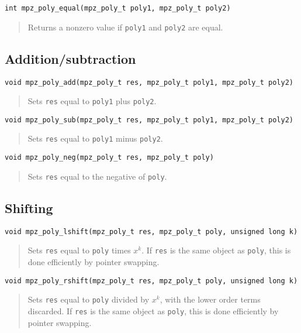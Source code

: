 \documentclass[a4paper,10pt]{article}
\newcommand{\code}{\lstinline}
\begin{document}
\begin{lstlisting}
int mpz_poly_equal(mpz_poly_t poly1, mpz_poly_t poly2)
\end{lstlisting}
\begin{quote}
Returns a nonzero value if \code{poly1} and \code{poly2} are equal.
\end{quote}



\subsection{Addition/subtraction}


\begin{lstlisting}
void mpz_poly_add(mpz_poly_t res, mpz_poly_t poly1, mpz_poly_t poly2)
\end{lstlisting}
\begin{quote}
Sets \code{res} equal to \code{poly1} plus \code{poly2}.
\end{quote}

\begin{lstlisting}
void mpz_poly_sub(mpz_poly_t res, mpz_poly_t poly1, mpz_poly_t poly2)
\end{lstlisting}
\begin{quote}
Sets \code{res} equal to \code{poly1} minus \code{poly2}.
\end{quote}

\begin{lstlisting}
void mpz_poly_neg(mpz_poly_t res, mpz_poly_t poly)
\end{lstlisting}
\begin{quote}
Sets \code{res} equal to the negative of \code{poly}.
\end{quote}


\subsection{Shifting}

\begin{lstlisting}
void mpz_poly_lshift(mpz_poly_t res, mpz_poly_t poly, unsigned long k)
\end{lstlisting}
\begin{quote}
Sets \code{res} equal to \code{poly} times $x^k$. If \code{res} is the same object as \code{poly}, this is done efficiently by pointer swapping.
\end{quote}

\begin{lstlisting}
void mpz_poly_rshift(mpz_poly_t res, mpz_poly_t poly, unsigned long k)
\end{lstlisting}
\begin{quote}
Sets \code{res} equal to \code{poly} divided by $x^k$, with the lower order terms discarded. If \code{res} is the same object as \code{poly}, this is done efficiently by pointer swapping.
\end{quote}
\end{document}
